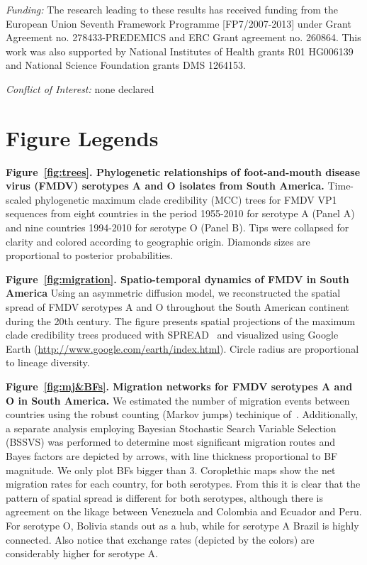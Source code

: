 \documentclass[10pt]{article}
\begin{document}
\emph{Funding:} The research leading to these results has received funding from the European Union Seventh Framework Programme [FP7/2007-2013] under Grant Agreement no. 278433-PREDEMICS and ERC Grant agreement no. 260864.
This work was also supported by National Institutes of Health grants R01 HG006139 and National Science Foundation grants DMS 1264153.

\emph{Conflict of Interest:} none declared

\newpage

\newpage
\section*{Figure Legends}

{\bf Figure~\ref{fig:trees}. Phylogenetic relationships of foot-and-mouth disease virus (FMDV) serotypes A and O isolates from South America.} Time-scaled phylogenetic maximum clade credibility (MCC) trees for FMDV VP1 sequences from eight countries in the period 1955-2010 for serotype A (Panel A) and nine countries 1994-2010 for serotype O (Panel B).
Tips were collapsed for clarity and colored according to geographic origin.
Diamonds sizes are proportional to posterior probabilities.

{\bf Figure~\ref{fig:migration}. Spatio-temporal dynamics of FMDV in South America} Using an asymmetric diffusion model, we reconstructed the spatial spread of FMDV serotypes A and O throughout the South American continent during the 20th century.
The figure presents spatial projections of the maximum clade credibility trees produced with SPREAD~\cite{spread} and visualized using Google Earth (\url{http://www.google.com/earth/index.html}).
Circle radius are proportional to lineage diversity.

{\bf Figure~\ref{fig:mj&BFs}. Migration networks for FMDV serotypes A and O in South America.} We estimated the number of migration events between countries using the robust counting (Markov jumps) techinique of~\cite{Minin2008}.
Additionally, a separate analysis employing Bayesian Stochastic Search Variable Selection (BSSVS) was performed to determine most significant migration routes and Bayes factors are depicted by arrows, with line thickness proportional to BF magnitude.
We only plot BFs bigger than $3$.
Coroplethic maps show the net migration rates for each country, for both serotypes.
From this it is clear that the pattern of spatial spread is different for both serotypes, although there is agreement on the likage between Venezuela and Colombia and Ecuador and Peru.
For serotype O, Bolivia stands out as a hub, while for serotype A Brazil is highly connected.
Also notice that exchange rates (depicted by the colors) are considerably higher for serotype A.
\end{document}

